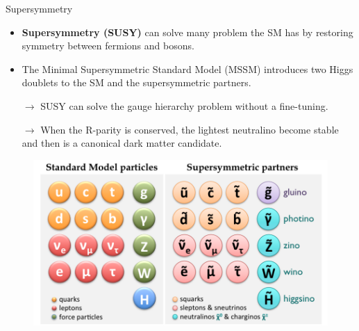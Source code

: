 \begin{frame}[fragile]{Supersymmetry}
  \begin{itemize}
    \item {\bf Supersymmetry (SUSY)} can solve many problem the SM has by restoring symmetry between fermions and bosons.
    \item The Minimal Supersymmetric Standard Model (MSSM) introduces two Higgs doublets to the SM and the supersymmetric partners.
    \item[\(\rightarrow\)] SUSY can solve the gauge hierarchy problem without a fine-tuning.
    \item[\(\rightarrow\)] When the R-parity is conserved, the lightest neutralino become stable and then is a canonical dark matter candidate.
  \end{itemize}

  \begin{figure}[htpb]
    \centering
    \includegraphics[height=0.4\textheight]{fig/susy_particles.png}
  \end{figure}

\end{frame}


